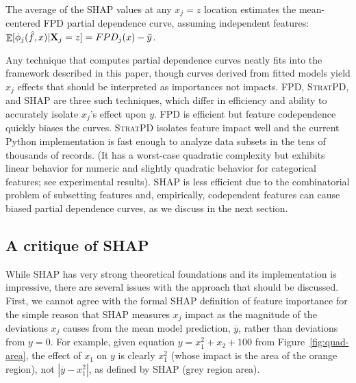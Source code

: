 \documentclass[11pt]{article}
\newcommand{\figref}[1]{Figure~\ref{#1}}
\DeclareMathOperator{\Ex}{\mathbb{E}}
\newcommand{\spd}{\fontfamily{cmr}\textsc{\small StratPD}}
\begin{document}
\begin{theorem}\label{thm}
The average of the SHAP values at any $x_j=z$ location estimates the mean-centered FPD partial dependence curve, assuming independent features: $\Ex[ \phi_j(\hat{f},x) | {\bf X}_j = z] = FPD_j(x) - \bar{y}$.
\end{theorem}

Any technique that computes partial dependence curves neatly fits into the framework described in this paper, though curves derived from fitted models yield $x_j$ effects that should be interpreted as importances not impacts. FPD, \spd{}, and SHAP are three such techniques, which differ in efficiency and ability to accurately isolate $x_j$'s effect upon $y$. FPD is efficient but feature codependence quickly biases the curves. \spd{} isolates feature impact well and the current Python implementation is fast enough to analyze data subsets in the tens of thousands of records. (It has a worst-case quadratic complexity but exhibits linear behavior for numeric and slightly quadratic behavior for categorical features; see experimental results). SHAP is less efficient due to the combinatorial problem of subsetting features and, empirically, codependent features can cause biased partial dependence curves, as we discuss in the next section.

\subsection{A critique of SHAP}

While SHAP has very strong theoretical foundations and its implementation is impressive, there are several issues with the approach that should be discussed.  First, we cannot agree with the formal SHAP definition of feature importance for the simple reason that SHAP measures $x_j$ impact as the magnitude of the deviations $x_j$ causes from the mean model prediction, $\overline{y}$, rather than deviations from $y=0$.   For example, given equation $y=x_1^2 + x_2 + 100$ from \figref{fig:quad-area}, the effect of $x_1$ on $y$ is clearly $x_1^2$ (whose impact is the area of the orange region), not $|\overline{y} - x_1^2|$, as defined by SHAP (grey region area). 
\end{document}
